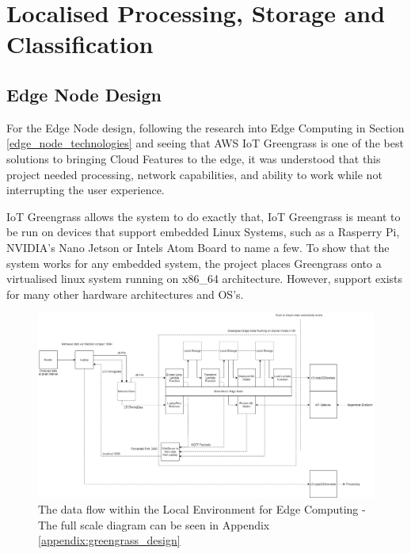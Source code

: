 \section{Localised Processing, Storage and Classification}
% 

\subsection{Edge Node Design}
For the Edge Node design, following the research into Edge Computing in Section \ref{edge_node_technologies} and seeing that AWS IoT Greengrass is one of the best solutions to bringing Cloud Features to the edge, it was understood that this project needed processing, network capabilities, and ability to work while not interrupting the user experience. 

IoT Greengrass allows the system to do exactly that, IoT Greengrass is meant to be run on devices that support embedded Linux Systems, such as a Rasperry Pi, NVIDIA's Nano Jetson or Intels Atom Board to name a few. To show that the system works for any embedded system, the project places Greengrass onto a virtualised linux system running on x86\_64 architecture. However, support exists for many  other hardware architectures and OS's.
\begin{figure}[ht]
    \centering
    \includegraphics[width=1\linewidth]{pages/Chapter3/Chapter 3 images/greengrass_data_flow.png}
    \caption{The data flow within the Local Environment for Edge Computing - The full scale diagram can be seen in Appendix \ref{appendix:greengrass_design}}
    \label{fig:greengrass_edge_design}
\end{figure}

